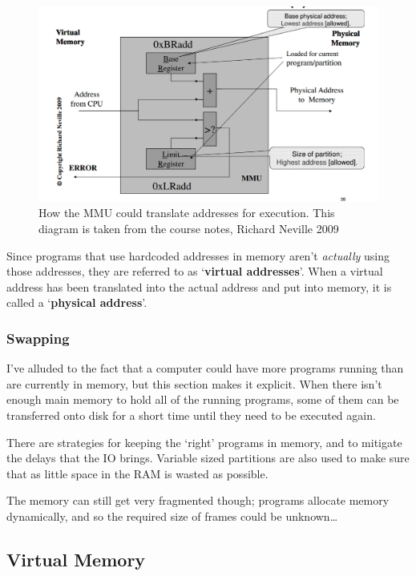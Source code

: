\begin{figure}[ht!]
  \centering
  \includegraphics[width=\textwidth]{images/mmu-loader.jpg}
  \caption{How the MMU could translate addresses for execution. This diagram is
  taken from the course notes, \textcopyright Richard Neville 2009}
  \label{mmu-translate}
\end{figure}

Since programs that use hardcoded addresses in memory aren't \textit{actually}
using those addresses, they are referred to as `\textbf{virtual addresses}'.
When a virtual address has been translated into the actual address and put into
memory, it is called a `\textbf{physical address}'.

\subsubsection{Swapping}

I've alluded to the fact that a computer could have more programs running than
are currently in memory, but this section makes it explicit. When there isn't
enough main memory to hold all of the running programs, some of them can be
transferred onto disk for a short time until they need to be executed again.

There are strategies for keeping the `right' programs in memory, and to mitigate
the delays that the IO brings. Variable sized partitions are also used to make
sure that as little space in the RAM is wasted as possible.

The memory can still get very fragmented though; programs allocate memory
dynamically, and so the required size of frames could be unknown\dots

\subsection{Virtual Memory}

